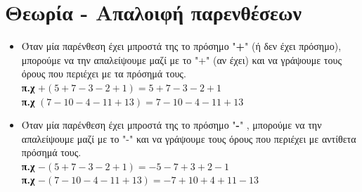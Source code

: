 \documentclass[a4paper,10pt]{report}
\begin{document}
\section*{Θεωρία - Απαλοιφή παρενθέσεων\hfill \small{}}
\begin{itemize}
 \item Όταν μία παρένθεση έχει μπροστά της το πρόσημο "\textbf{+}" (ή δεν έχει πρόσημο), μπορούμε να την 
       απαλείψουμε μαζί με το "+" (αν έχει) και να γράψουμε τους όρους που περιέχει με τα πρόσημά τους.\\
       \textbf{π.χ} $+(5+7-3-2+1)=5+7-3-2+1$ \\
       \textbf{π.χ} $(7-10-4-11+13)=7-10-4-11+13$ \\
 \item Όταν μία παρένθεση έχει μπροστά της το πρόσημο "\textbf{-}" , μπορούμε να την 
       απαλείψουμε μαζί με το "-" και να γράψουμε τους όρους που περιέχει με αντίθετα πρόσημά τους.\\
       \textbf{π.χ} $-(5+7-3-2+1)=-5-7+3+2-1$ \\
       \textbf{π.χ} $-(7-10-4-11+13)=-7+10+4+11-13$ \\      
\end{itemize}
\end{document}
